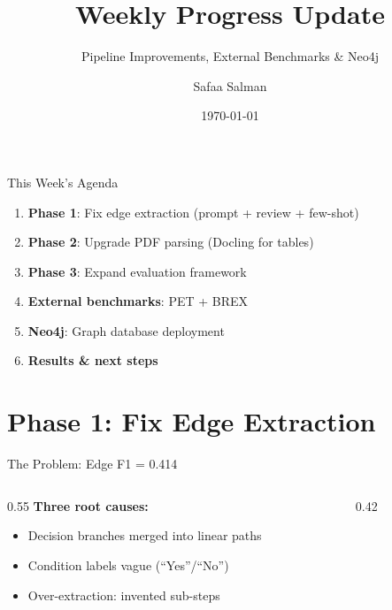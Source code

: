 \documentclass[aspectratio=169, 12pt]{beamer}
\title{Weekly Progress Update}
\subtitle{Pipeline Improvements, External Benchmarks \& Neo4j}
\author{Safaa Salman}
\date{\today}
\begin{document}
\begin{frame}
\titlepage
\end{frame}

\begin{frame}{This Week's Agenda}
\begin{enumerate}
    \item \textbf{Phase 1}: Fix edge extraction (prompt + review + few-shot)
    \item \textbf{Phase 2}: Upgrade PDF parsing (Docling for tables)
    \item \textbf{Phase 3}: Expand evaluation framework
    \item \textbf{External benchmarks}: PET + BREX
    \item \textbf{Neo4j}: Graph database deployment
    \item \textbf{Results \& next steps}
\end{enumerate}
\end{frame}

\section{Phase 1: Fix Edge Extraction}

\begin{frame}{The Problem: Edge F1 = 0.414}
\begin{columns}
\begin{column}{0.55\textwidth}
\textbf{Three root causes:}
\begin{itemize}
    \item Decision branches merged into linear paths
    \item Condition labels vague (``Yes''/``No'')
    \item Over-extraction: invented sub-steps
\end{itemize}
\end{column}
\begin{column}{0.42\textwidth}
\end{column}
\end{columns}
\end{frame}
\end{document}
